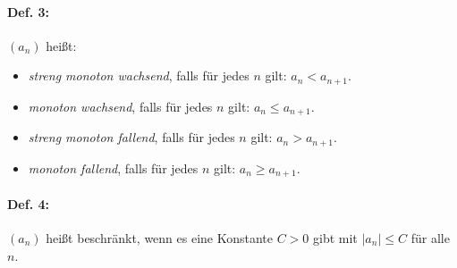 \paragraph{Def. 3:} \parskp
$(a_n)$ heißt:
\begin{itemize}
\item \emph{streng monoton wachsend}, falls für jedes $n$ gilt: $a_n<a_{n+1}$.
\item \emph{monoton wachsend}, falls für jedes $n$ gilt: $a_n\leq a_{n+1}$.
\item \emph{streng monoton fallend}, falls für jedes $n$ gilt: $a_n>a_{n+1}$.
\item \emph{monoton fallend}, falls für jedes $n$ gilt: $a_n\geq a_{n+1}$.
\end{itemize}
\paragraph{Def. 4:} \parskp
$(a_n)$ heißt beschränkt, wenn es eine Konstante $C>0$ gibt mit $|a_n|\leq C$ für alle $n$.






 